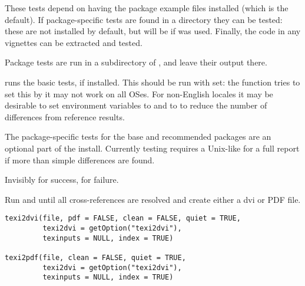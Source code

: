 %
\begin{Details}\relax
These tests depend on having the package example files installed (which
is the default).  If package-specific tests are found in a
 directory they can be tested: these are not
installed by default, but will be if
 was used.  Finally, the \R{}
code in any vignettes can be extracted and tested.

Package tests are run in a  subdirectory of
, and leave their output there.

 runs the basic tests, if installed.  This
should be run with  set: the function tries to set
this by it may not work on all OSes.  For non-English locales it may
be desirable to set environment variables  to 
and  to  to reduce the number of differences from
reference results.

The package-specific tests for the base and recommended packages are
an optional part of the install.
Currently testing requires a Unix-like  for a full report
if more than simple differences are found.
\end{Details}
%
\begin{Value}
Invisibly  for success,  for failure.
\end{Value}
%
\begin{Description}\relax
Run  and  until all cross-references are
resolved and create either a dvi or PDF file.
\end{Description}
%
\begin{Usage}
\begin{verbatim}
texi2dvi(file, pdf = FALSE, clean = FALSE, quiet = TRUE,
         texi2dvi = getOption("texi2dvi"),
         texinputs = NULL, index = TRUE)

texi2pdf(file, clean = FALSE, quiet = TRUE,
         texi2dvi = getOption("texi2dvi"),
         texinputs = NULL, index = TRUE)
\end{verbatim}
\end{Usage}
%
